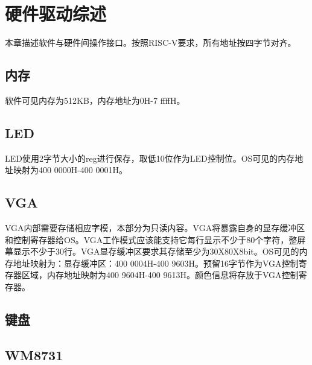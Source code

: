 %
% 
% 
% 
% 
% 
% 
%

\chapter{硬件驱动综述}
本章描述软件与硬件间操作接口。按照RISC-V要求，所有地址按四字节对齐。
\section{内存}
软件可见内存为512KB，内存地址为0H-7 ffffH。
\section{LED}
LED使用2字节大小的reg进行保存，取低10位作为LED控制位。OS可见的内存地址映射为400 0000H-400 0001H。
\section{VGA}
VGA内部需要存储相应字模，本部分为只读内容。VGA将暴露自身的显存缓冲区和控制寄存器给OS。VGA工作模式应该能支持它每行显示不少于80个字符，整屏幕显示不少于30行。VGA显存缓冲区要求其存储至少为30X80X8bit。OS可见的内存地址映射为：显存缓冲区：400 0004H-400 9603H。预留16字节作为VGA控制寄存器区域，内存地址映射为400 9604H-400 9613H。颜色信息将存放于VGA控制寄存器。
\section{键盘}
\section{WM8731}